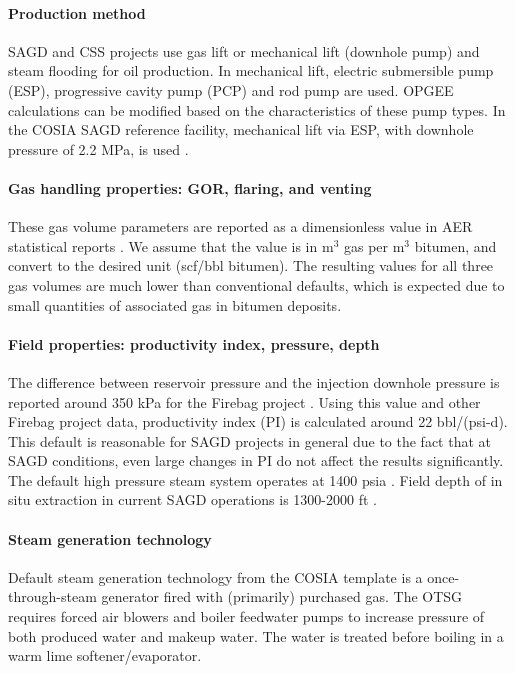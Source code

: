 \documentclass[11pt]{report}
\begin{document}
\paragraph{Production method}
SAGD and CSS projects use gas lift or mechanical lift (downhole pump) and steam flooding for oil production. In mechanical lift, electric submersible pump (ESP), progressive cavity pump (PCP) and rod pump are used. OPGEE calculations can be modified based on the characteristics of these pump types.
In the COSIA SAGD reference facility, mechanical lift via ESP, with downhole pressure of 2.2 MPa, is used \cite{COSIA2014}.

\paragraph{Gas handling properties: GOR, flaring, and venting}
These gas volume parameters are reported as a dimensionless value in AER statistical reports \cite{AERvar}. We assume that the value is in m$^3$ gas per m$^3$ bitumen, and convert to the desired unit (scf/bbl bitumen). The resulting values for all three gas volumes are much lower than conventional defaults, which is expected due to small quantities of associated gas in bitumen deposits.

\paragraph{Field properties: productivity index, pressure, depth}
The difference between reservoir pressure and the injection downhole pressure is reported around 350 kPa for the Firebag project \cite{AERvarISPP}. Using this value and other Firebag project data, productivity index (PI) is calculated around 22 bbl/(psi-d). This default is reasonable for SAGD projects in general due to the fact that at SAGD conditions, even large changes in PI do not affect the results significantly.   The default high pressure steam system operates at 1400 psia \cite{COSIA2014}.  Field depth of in situ extraction in current SAGD operations is 1300-2000 ft \cite{COSIA2014}.

\paragraph{Steam generation technology}
Default steam generation technology from the COSIA template is a once-through-steam generator fired with (primarily) purchased gas.  The OTSG requires forced air blowers and boiler feedwater pumps to increase pressure of both produced water and makeup water.  The water is treated before boiling in a warm lime softener/evaporator.
\end{document}
